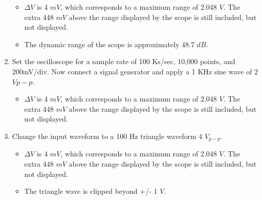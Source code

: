 \documentclass[letter,12pt]{article}
\begin{document}
\begin{enumerate}
	\begin{itemize}
		\item $\Delta V$ is 4 $mV$, which corresponds to a maximum range of 2.048 $V$.  The extra 448 $mV$ above the range displayed by the scope is still included, but not displayed.
		
		\item The dynamic range of the scope is approximately 48.7 $dB$.
	\end{itemize}
	
	\item Set the oscilloscope for a sample rate of 100 Ks/sec, 10,000 points, and 200mV/div. Now connect a signal generator and apply a 1 KHz sine wave of 2 $V{p-p}$.
	
	\begin{itemize}
		\item $\Delta V$ is 4 $mV$, which corresponds to a maximum range of 2.048 $V$.  The extra 448 $mV$ above the range displayed by the scope is still included, but not displayed.
	\end{itemize}
	
	\item Change the input waveform to a 100 Hz triangle waveform 4 $V_{p-p}$.
	
	\begin{itemize}
		\item $\Delta V$ is 4 $mV$, which corresponds to a maximum range of 2.048 $V$.  The extra 448 $mV$ above the range displayed by the scope is still included, but not displayed.
		
		\item The triangle wave is clipped beyond +/- 1 $V$.
	\end{itemize}
	
\end{enumerate}
\end{document}
